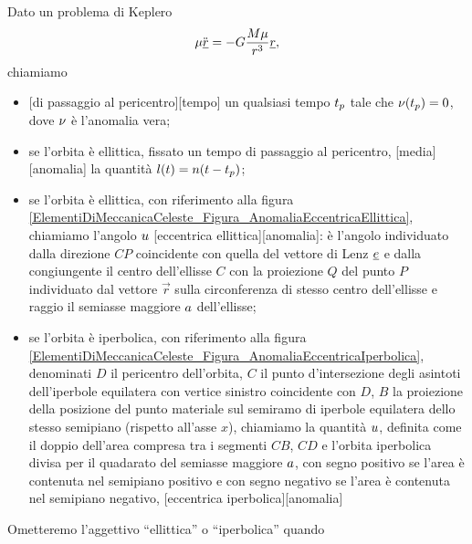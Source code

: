 \begin{Definition}
	Dato un problema di Keplero
	\[
		\mu \ddot{\underline{r}}
    = - G \frac{M\mu}{r^3}\underline{r},
	\]
	chiamiamo
	\begin{itemize}
		\item
    [di passaggio al pericentro][tempo]
      un qualsiasi tempo ${t_p}$ tale che
      $\nu({t_p}) = 0$, dove $\nu$ \`e
      l'anomalia vera;
		\item se l'orbita \`e ellittica,
      fissato un tempo di passaggio al pericentro,
      [media][anomalia] la quantit\`a
      $l(t) = n(t - {t_p})$;
		\item se l'orbita \`e ellittica,
      con riferimento alla figura
      \ref{ElementiDiMeccanicaCeleste_Figura_AnomaliaEccentricaEllittica},
      chiamiamo l'angolo $u$
      [eccentrica ellittica][anomalia]:
      \`e l'angolo individuato dalla direzione $CP$ coincidente con
      quella del vettore di Lenz $\underline{e}$ e dalla congiungente
      il centro dell'ellisse $C$ con la proiezione $Q$ del punto $P$
      individuato dal vettore $\vec{r}$ sulla circonferenza di stesso
      centro dell'ellisse e raggio il semiasse maggiore $a$
      dell'ellisse;
    \item se l'orbita \`e iperbolica,
      con riferimento alla figura
      \ref{ElementiDiMeccanicaCeleste_Figura_AnomaliaEccentricaIperbolica},
      denominati $D$ il pericentro dell'orbita,
      $C$ il punto d'intersezione degli asintoti dell'iperbole
      equilatera con vertice sinistro coincidente con $D$,
      $B$ la proiezione della posizione del punto materiale sul semiramo
      di iperbole equilatera dello stesso semipiano (rispetto all'asse $x$),
      chiamiamo la quantit\`a $u$, definita come il doppio
      dell'area compresa tra i segmenti $CB$, $CD$ e
      l'orbita iperbolica divisa per il quadarato del semiasse maggiore
      $a$, con segno positivo se l'area \`e contenuta nel
      semipiano positivo e con segno negativo se l'area \`e contenuta nel
      semipiano negativo,
      [eccentrica iperbolica][anomalia]
	\end{itemize}
\end{Definition}
\par Ometteremo l'aggettivo ``ellittica'' o ``iperbolica'' quando

